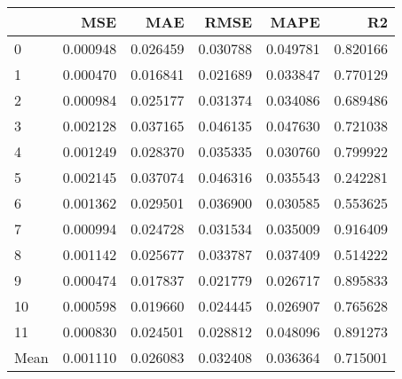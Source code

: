 \begin{tabular}{lrrrrr}
\toprule
 & MSE & MAE & RMSE & MAPE & R2 \\
\midrule
0 & 0.000948 & 0.026459 & 0.030788 & 0.049781 & 0.820166 \\
1 & 0.000470 & 0.016841 & 0.021689 & 0.033847 & 0.770129 \\
2 & 0.000984 & 0.025177 & 0.031374 & 0.034086 & 0.689486 \\
3 & 0.002128 & 0.037165 & 0.046135 & 0.047630 & 0.721038 \\
4 & 0.001249 & 0.028370 & 0.035335 & 0.030760 & 0.799922 \\
5 & 0.002145 & 0.037074 & 0.046316 & 0.035543 & 0.242281 \\
6 & 0.001362 & 0.029501 & 0.036900 & 0.030585 & 0.553625 \\
7 & 0.000994 & 0.024728 & 0.031534 & 0.035009 & 0.916409 \\
8 & 0.001142 & 0.025677 & 0.033787 & 0.037409 & 0.514222 \\
9 & 0.000474 & 0.017837 & 0.021779 & 0.026717 & 0.895833 \\
10 & 0.000598 & 0.019660 & 0.024445 & 0.026907 & 0.765628 \\
11 & 0.000830 & 0.024501 & 0.028812 & 0.048096 & 0.891273 \\
Mean & 0.001110 & 0.026083 & 0.032408 & 0.036364 & 0.715001 \\
\bottomrule
\end{tabular}
